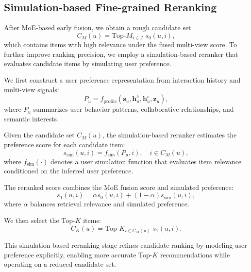 \documentclass[sigconf,anonymous]{acmart}
\begin{document}
\subsection{Simulation-based Fine-grained Reranking}

After MoE-based early fusion, we obtain a rough candidate set
\begin{equation}
C_M(u) = \text{Top-}M_{i \in \mathcal{I}} \; s_0(u,i),
\end{equation}
which contains items with high relevance under the fused multi-view score. To further improve ranking precision, we employ a simulation-based reranker that evaluates candidate items by simulating user preference.

We first construct a user preference representation from interaction history and multi-view signals:
\begin{equation}
P_u = f_{\text{profile}}(\mathbf{s}_u, \mathbf{h}_u^{b}, \mathbf{h}_u^{c}, \mathbf{z}_u),
\end{equation}
where $P_u$ summarizes user behavior patterns, collaborative relationships, and semantic interests.

Given the candidate set $C_M(u)$, the simulation-based reranker estimates the preference score for each candidate item:
\begin{equation}
s_{\text{sim}}(u,i) = f_{\text{sim}}(P_u, i), \quad i \in C_M(u),
\end{equation}
where $f_{\text{sim}}(\cdot)$ denotes a user simulation function that evaluates item relevance conditioned on the inferred user preference.

The reranked score combines the MoE fusion score and simulated preference:
\begin{equation}
s_1(u,i)
=
\alpha s_0(u,i)
+
(1-\alpha)s_{\text{sim}}(u,i),
\end{equation}
where $\alpha$ balances retrieval relevance and simulated preference.

We then select the Top-$K$ items:
\begin{equation}
C_K(u) = \text{Top-}K_{i \in C_M(u)} \; s_1(u,i).
\end{equation}

This simulation-based reranking stage refines candidate ranking by modeling user preference explicitly, enabling more accurate Top-$K$ recommendations while operating on a reduced candidate set.

\end{document}
